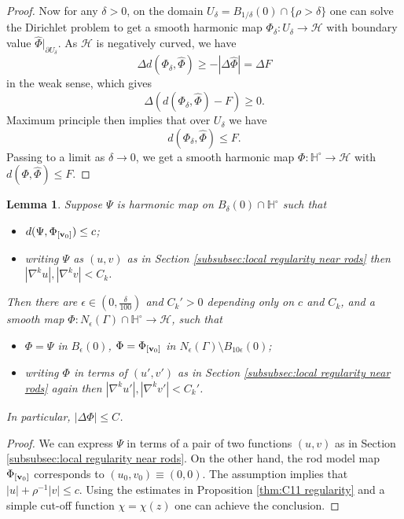 \documentclass[a4paper,11pt]{amsart}
\newtheorem{lemma}[theorem]{Lemma}
\theoremstyle{definition}
\numberwithin{equation}{section}
\newcommand{\dH}{\mathbb{H}}
\DeclareMathOperator{\bv}{{\bf v}}
\begin{document}
\begin{proof}
	Now for any $\delta>0$, on the domain $U_\delta=B_{1/\delta}(0)\cap\{\rho>\delta\}$ one can solve the Dirichlet problem  to get a smooth harmonic map $\Phi_\delta: U_\delta\to\mathcal{H}$ with boundary value $\widehat{\Phi}|_{\partial U_\delta}$.  As $\mathcal{H}$ is negatively curved,  we have $$\Delta{d(\Phi_\delta,\widehat{\Phi})}\geq-|\Delta\widehat{\Phi}|=\Delta F$$ in the weak sense, which gives $$\Delta(d(\Phi_\delta,\widehat{\Phi})-F)\geq0.$$
	Maximum principle then implies that  over $U_\delta$ we have
    $$d(\Phi_\delta,\widehat{\Phi})\leq F.$$
    Passing to a limit as $\delta\to0$, we get a smooth harmonic map $\Phi:\mathbb H^\circ\to\mathcal{H}$ with $d(\Phi, \widehat\Phi)\leq F$. 
\end{proof}


\begin{lemma}\label{l:interpolation}
	Suppose $\Psi$ is  harmonic map  on $B_\delta(0)\cap  \dH^\circ$ such that 
    \begin{itemize}
        \item $d(\Psi, \Phi_{[\bv_0]})\leq c$;
        \item writing $\Psi$ as $(u,v)$ as in Section \ref{subsubsec:local regularity near rods} then $|\nabla^{k}u|,|\nabla^{k}v|<C_k$. 
    \end{itemize} 
    Then there are $\epsilon\in (0, \frac{\delta}{100})$ and $C_k'>0$ depending only on $c$ and $C_k$, and  a smooth map  $\Phi: N_\epsilon(\Gamma)\cap \dH^\circ\rightarrow \mathcal H$, such that 
    \begin{itemize}
        \item $\Phi=\Psi$ in $B_\epsilon(0)$, $\Phi=\Phi_{[\bv_0]}$ in $N_\epsilon(\Gamma)\setminus B_{10\epsilon}(0)$;
        \item writing $\Phi$ in terms of $(u',v')$ as in Section \ref{subsubsec:local regularity near rods} again then $|\nabla^{k}u'|,|\nabla^kv'|<C_k'$.
    \end{itemize}
    In particular, $|\Delta\Phi|\leq C$.
\end{lemma}
\begin{proof}
We can express $\Psi$  in terms of a pair of two functions $(u, v)$ as in Section \ref{subsubsec:local regularity near rods}. On the other hand, the rod model map $\Phi_{[\bv_0]}$ corresponds to $(u_0, v_0)\equiv (0, 0)$. The assumption implies that $|u|+\rho^{-1}|v|\leq c$. Using the estimates in Proposition \ref{thm:C11 regularity} and a simple cut-off function $\chi=\chi(z)$ one can achieve the conclusion. 
\end{proof}
\end{document}
